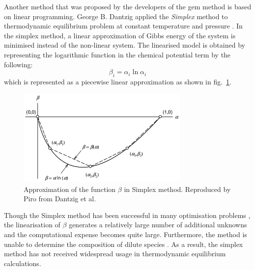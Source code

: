 	Another method that was proposed by the developers of the \gls{gem} method is based on linear programming. George B. Dantzig applied the \emph{Simplex} method to thermodynamic equilibrium problem at constant temperature and pressure \cite{Dantzig:1957aa,Dantzig:1958aa}. In the simplex method, a linear approximation of Gibbs energy of the system is minimised instead of the non-linear system. The linearised model is obtained by representing the logarithmic function in the chemical potential term by the following:
	\begin{equation}
		\beta_i = \alpha_i \ln \alpha_i
	\end{equation}
 which is represented as a piecewise linear approximation as shown in fig.~\ref{fig:simplex}.
 	\begin{figure}[htbp]
		\centering
		\includegraphics[width=0.75\textwidth]{figures/chapter-5/Simplex}
		\caption[Approximation of the function $\beta$ in simplex method.]{Approximation of the function $\beta$ in Simplex method. Reproduced by Piro \cite{Piro11b} from Dantzig et al. \cite{Dantzig:1957aa}}
		\label{fig:simplex}
	\end{figure}
	Though the Simplex method has been successful in many optimisation problems \cite{Dantzig:2016aa}, the linearisation of $\beta$ generates a relatively large number of additional unknowns and the computational expense becomes quite large. Furthermore, the method is unable to determine the composition of dilute species \cite{vanZeggeren11}. As a result, the simplex method has not received widespread usage in thermodynamic equilibrium calculations.


